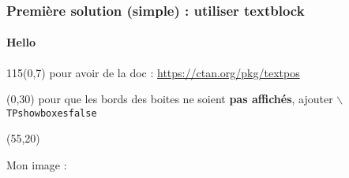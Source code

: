\documentclass[a4paper,11pt]{beamer}
\begin{document}

\begin{frame}

\frametitle{Première solution (simple) : utiliser textblock}
\framesubtitle{Hello}

\begin{textblock}{115}(0,7)
pour avoir de la doc : \quad \url{https://ctan.org/pkg/textpos}
\end{textblock}

\begin{textblock}{50}(0,30)
pour que les bords des boites ne soient \textbf{pas affichés},
ajouter $\backslash$\texttt{TPshowboxesfalse}
\end{textblock}


\begin{textblock}{50}(55,20)
\begin{center}
Mon image :

\vspace{3mm}

\end{center}
\end{textblock}


\end{frame}


\newcommand {\horloge} [4] [black] {%
\def \R {.4}
\begin{scope}[xshift=#3cm,yshift=#4cm,color=#1]
\draw[thick,fill=white] (0,0) circle (\R);
\draw[fill]  (0,0) circle (.03);
\foreach \n in {0,30,...,330} {\draw (\n:\R)--(\n:.32);}
\foreach \n in {0,90,...,270} {\draw[thick] (\n:\R)--(\n:.3);}
\draw [thick,->,>=latex] (0,0)--({90-#2*6}:\R);
\end{scope}}

\end{document}
